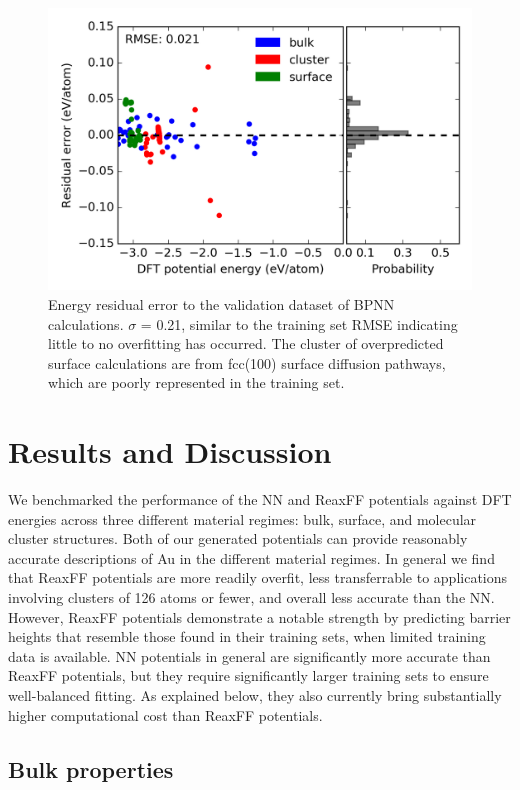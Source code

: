 \documentclass[12pt]{cmuthesis}
\begin{document}
\begin{figure}[h]
\centering
\includegraphics[width=5in]{./images/fig-neural-valid.png}
\caption{\label{fig-neural-valid}
Energy residual error to the validation dataset of BPNN calculations. \(\sigma\) = 0.21, similar to the training set RMSE indicating little to no overfitting has occurred. The cluster of overpredicted surface calculations are from fcc(100) surface diffusion pathways, which are poorly represented in the training set.}
\end{figure}

\section{Results and Discussion}
\label{sec:org0940569}
We benchmarked the performance of the NN and ReaxFF potentials against DFT energies across three different material regimes: bulk, surface, and molecular cluster structures. Both of our generated potentials can provide reasonably accurate descriptions of Au in the different material regimes. In general we find that ReaxFF potentials are more readily overfit, less transferrable to applications involving clusters of 126 atoms or fewer, and overall less accurate than the NN. However, ReaxFF potentials demonstrate a notable strength by predicting barrier heights that resemble those found in their training sets, when limited training data is available. NN potentials in general are significantly more accurate than ReaxFF potentials, but they require significantly larger training sets to ensure well-balanced fitting. As explained below, they also currently bring substantially higher computational cost than ReaxFF potentials.

\subsection{Bulk properties}
\label{sec:orgf627ded}
\end{document}
